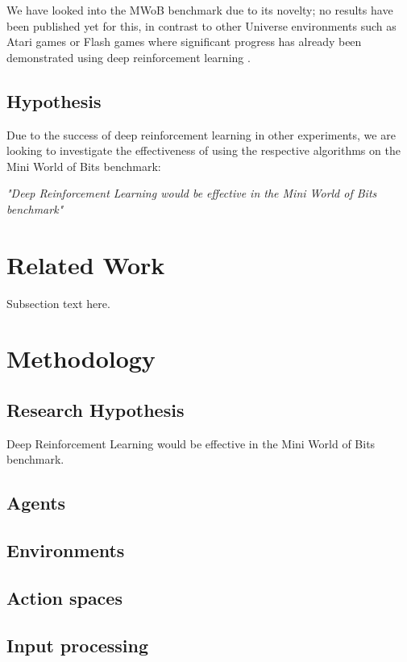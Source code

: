 \documentclass[conference]{IEEEtran}
\begin{document}
We have looked into the MWoB benchmark due to its novelty; no results have been published yet for this, in contrast to other Universe environments such as Atari games or Flash games where significant progress has already been demonstrated using deep reinforcement learning \cite{mnih2013playing}.

\subsection{Hypothesis}
Due to the success of deep reinforcement learning in other experiments, we are looking to investigate the effectiveness of using the respective algorithms on the Mini World of Bits benchmark:
\begin{center}
\textit{"Deep Reinforcement Learning would be effective in the Mini World of Bits benchmark"}
\end{center}

\section{Related Work}
Subsection text here.

\section{Methodology}

\subsection{Research Hypothesis}
Deep Reinforcement Learning would be effective in the Mini World of Bits benchmark.

\subsection{Agents}

\subsection{Environments}

\subsection{Action spaces}

\subsection{Input processing}
\end{document}
